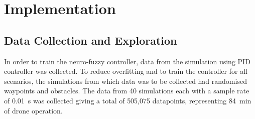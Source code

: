 \chapter{Implementation}\label{implementation}
\section{Data Collection and Exploration}
In order to train the neuro-fuzzy controller, data from the simulation using PID controller was collected. To reduce overfitting and to train the controller for all scenarios, the simulations from which data was to be collected had randomised waypoints and obstacles. The data from 40 simulations each with a sample rate of \SI{0.01}{\second} was collected giving a total of 505,075 datapoints, representing \SI{84}{\minute} of drone operation.  
 
